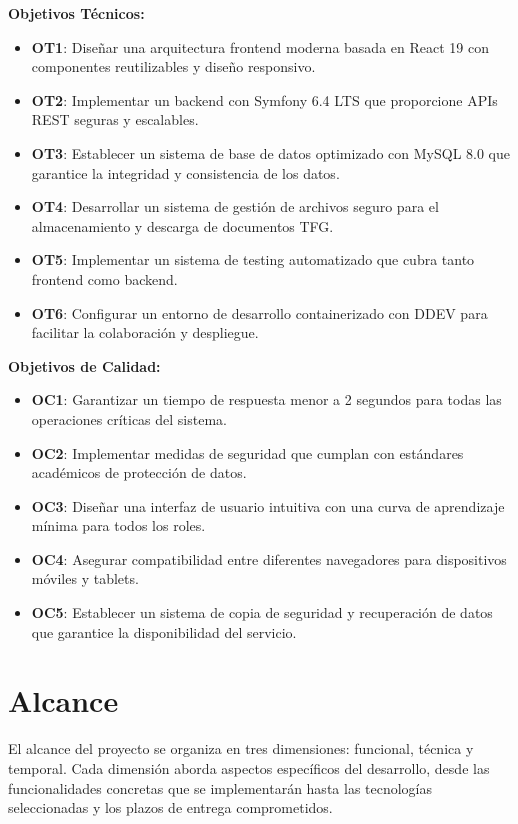\documentclass[12pt,a4paper,oneside]{report}
\providecommand{\tightlist}{%
  \setlength{\itemsep}{0pt}\setlength{\parskip}{0pt}}
\begin{document}
\textbf{Objetivos Técnicos:}

\begin{itemize}
\tightlist
\item
  \textbf{OT1}: Diseñar una arquitectura frontend moderna basada en
  React 19 con componentes reutilizables y diseño responsivo.
\item
  \textbf{OT2}: Implementar un backend con Symfony 6.4 LTS que
  proporcione APIs REST seguras y escalables.
\item
  \textbf{OT3}: Establecer un sistema de base de datos optimizado con
  MySQL 8.0 que garantice la integridad y consistencia de los datos.
\item
  \textbf{OT4}: Desarrollar un sistema de gestión de archivos seguro
  para el almacenamiento y descarga de documentos TFG.
\item
  \textbf{OT5}: Implementar un sistema de testing automatizado que cubra
  tanto frontend como backend.
\item
  \textbf{OT6}: Configurar un entorno de desarrollo containerizado con
  DDEV para facilitar la colaboración y despliegue.
\end{itemize}

\textbf{Objetivos de Calidad:}

\begin{itemize}
\tightlist
\item
  \textbf{OC1}: Garantizar un tiempo de respuesta menor a 2 segundos
  para todas las operaciones críticas del sistema.
\item
  \textbf{OC2}: Implementar medidas de seguridad que cumplan con
  estándares académicos de protección de datos.
\item
  \textbf{OC3}: Diseñar una interfaz de usuario intuitiva con una curva
  de aprendizaje mínima para todos los roles.
\item
  \textbf{OC4}: Asegurar compatibilidad entre diferentes navegadores para dispositivos móviles y tablets.
\item
  \textbf{OC5}: Establecer un sistema de copia de seguridad y recuperación de datos
  que garantice la disponibilidad del servicio.
\end{itemize}

\section{Alcance}\label{alcance}

El alcance del proyecto se organiza en tres dimensiones: funcional, técnica y temporal. Cada dimensión aborda aspectos específicos del desarrollo, desde las funcionalidades concretas que se implementarán hasta las tecnologías seleccionadas y los plazos de entrega comprometidos.
\end{document}
